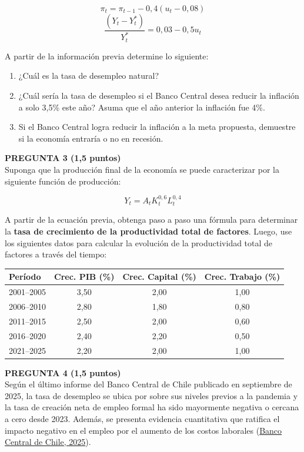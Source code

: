 \documentclass[11pt,addpoints]{article}
\begin{document}
\[
\pi_t = \pi_{t-1} - 0{,}4(u_t - 0{,}08)
\]
\[
\frac{(Y_t - Y_t^*)}{Y_t^*} = 0{,}03 - 0{,}5u_t
\]

A partir de la información previa determine lo siguiente:
\begin{enumerate}[label=\alph*)]
  \item ¿Cuál es la tasa de desempleo natural?
  \item ¿Cuál sería la tasa de desempleo si el Banco Central desea reducir la inflación a solo 3,5\% este año? Asuma que el año anterior la inflación fue 4\%.
  \item Si el Banco Central logra reducir la inflación a la meta propuesta, demuestre si la economía entraría o no en recesión.
\end{enumerate}

\newpage
\vspace*{0.5cm}

\textbf{PREGUNTA 3 (1,5 puntos)}\\[0.3cm]
Suponga que la producción final de la economía se puede caracterizar por la siguiente función de producción:

\[
Y_t = A_t K_t^{0{,}6} L_t^{0{,}4}
\]

A partir de la ecuación previa, obtenga paso a paso una fórmula para determinar la \textbf{tasa de crecimiento de la productividad total de factores}. Luego, use los siguientes datos para calcular la evolución de la productividad total de factores a través del tiempo:

\begin{center}
\begin{tabular}{lccc}
\toprule
\textbf{Período} & \textbf{Crec. PIB (\%)} & \textbf{Crec. Capital (\%)} & \textbf{Crec. Trabajo (\%)} \\
\midrule
2001–2005 & 3,50 & 2,00 & 1,00 \\
2006–2010 & 2,80 & 1,80 & 0,80 \\
2011–2015 & 2,50 & 2,00 & 0,60 \\
2016–2020 & 2,40 & 2,20 & 0,50 \\
2021–2025 & 2,20 & 2,00 & 1,00 \\
\bottomrule
\end{tabular}
\end{center}

\vspace{0.8cm}

\textbf{PREGUNTA 4 (1,5 puntos)}\\[0.3cm]
Según el último informe del Banco Central de Chile publicado en septiembre de 2025, la tasa de desempleo se ubica por sobre sus niveles previos a la pandemia y la tasa de creación neta de empleo formal ha sido mayormente negativa o cercana a cero desde 2023. Además, se presenta evidencia cuantitativa que ratifica el impacto negativo en el empleo por el aumento de los costos laborales (\href{https://www.bcentral.cl/documents/33528/7692839/IPoM+Septiembre+2025.pdf/af7fddd9-91c4-ac85-9f3a-3b71b6cf6ece}{Banco Central de Chile, 2025}).
\end{document}
